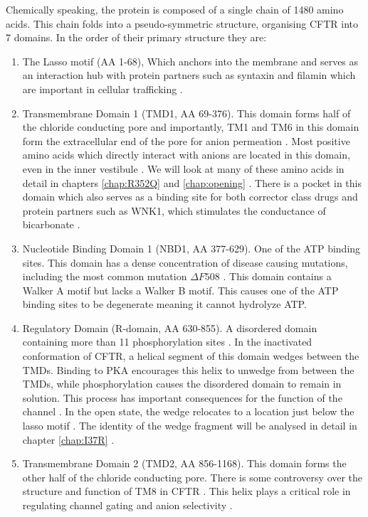 Chemically speaking, the protein is composed of a single chain of 1480 amino acids.  This chain folds into a pseudo-symmetric structure, organising CFTR into 7 domains. In the order of their primary structure they are: 

\begin{enumerate}
	\item The Lasso motif (AA 1-68), Which anchors into the membrane and serves as an interaction hub with protein partners such as syntaxin and filamin which are important in cellular trafficking \cite{cormet-boyaka2002, naren1998, thelin2007}. 
	\item Transmembrane Domain 1 (TMD1, AA 69-376). This domain forms half of the chloride conducting pore and importantly, TM1 and TM6 in this domain form the extracellular end of the pore for anion permeation \cite{linsdell2006, linsdell2022}. Most positive amino acids which directly interact with anions are located in this domain, even in the inner vestibule \cite{linsdell2018}. We will look at many of these amino acids in detail in chapters \ref{chap:R352Q} and \ref{chap:opening} \cite{wong2022a}. There is a pocket in this domain which also serves as a binding site for both corrector class drugs and protein partners such as WNK1, which stimulates the conductance of bicarbonate \cite{kim2019}. 
	\item Nucleotide Binding Domain 1 (NBD1, AA 377-629). One of the ATP binding sites. This domain has a dense concentration of disease causing mutations, including the most common mutation $\Delta F508$ \cite{cftr2}. This domain contains a Walker A motif but lacks a Walker B motif. This causes one of the ATP binding sites to be degenerate meaning it cannot hydrolyze ATP. 
	\item Regulatory Domain (R-domain, AA 630-855). A disordered domain containing more than 11 phosphorylation sites \cite{mihalyi2020}. In the inactivated conformation of CFTR, a helical segment of this domain wedges between the TMDs. Binding to PKA encourages this helix to unwedge from between the TMDs, while phosphorylation causes the disordered domain to remain in solution. This process has important consequences for the function of the channel \cite{ostedgaard2000, mihalyi2020, bozoky2013, baker2007}. In the open state, the wedge relocates to a location just below the lasso motif \cite{zhang2018}. The identity of the wedge fragment will be analysed in detail in chapter \ref{chap:I37R} \cite{wong2022}. 
	\item Transmembrane Domain 2 (TMD2, AA 856-1168). This domain forms the other half of the chloride conducting pore. There is some controversy over the structure and function of TM8 in CFTR \cite{hegedus2022, liu2019}. This helix plays a critical role in regulating channel gating and anion selectivity \cite{negoda2019}.

\end{enumerate}
